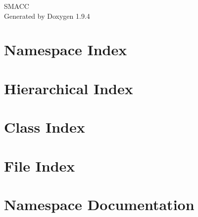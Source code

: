 \documentclass[twoside]{book}
\newcommand{\+}{\discretionary{\mbox{\scriptsize$\hookleftarrow$}}{}{}}
\newcommand{\clearemptydoublepage}{%
    \newpage{\pagestyle{empty}\cleardoublepage}%
  }
\begin{document}
  \raggedbottom
    \hypersetup{pageanchor=false,
                bookmarksnumbered=true,
                pdfencoding=unicode
               }
  \begin{titlepage}
  \vspace*{7cm}
  \begin{center}%
  {\Large SMACC}\\
  \vspace*{1cm}
  {\large Generated by Doxygen 1.9.4}\\
  \end{center}
  \end{titlepage}
  \clearemptydoublepage
  \tableofcontents
  \clearemptydoublepage
  \hypersetup{pageanchor=true}
\chapter{Namespace Index}

\chapter{Hierarchical Index}

\chapter{Class Index}

\chapter{File Index}

\chapter{Namespace Documentation}
























\end{document}

